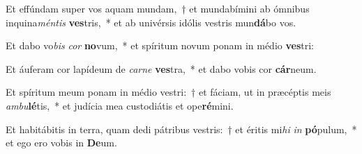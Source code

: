 \item Et effúndam super vos aquam mundam,~† et mundabímini ab ómnibus inquina\textit{mén}\textit{tis} \textbf{ves}tris,~* et ab univérsis idólis vestris mun\textbf{dá}bo vos.
\item Et dabo vo\textit{bis} \textit{cor} \textbf{no}vum,~* et spíritum novum ponam in médio \textbf{ves}tri:
\item Et áuferam cor lapídeum de \textit{car}\textit{ne} \textbf{ves}tra,~* et dabo vobis cor \textbf{cár}neum.
\item Et spíritum meum ponam in médio vestri:~† et fáciam, ut in præcéptis meis \textit{am}\textit{bu}\textbf{lé}tis,~* et judícia mea custodiátis et ope\textbf{ré}mini.
\item Et habitábitis in terra, quam dedi pátribus vestris:~† et éritis mi\textit{hi} \textit{in} \textbf{pó}pulum,~* et ego ero vobis in \textbf{De}um.
